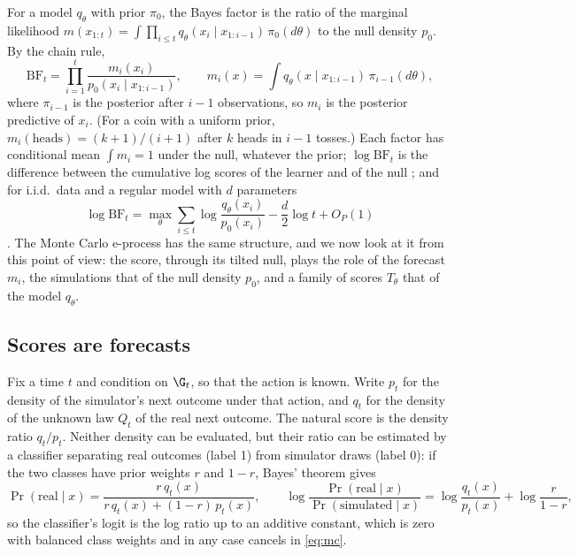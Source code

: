 For a model $q_\theta$ with prior $\pi_0$, the Bayes factor is the ratio of
the marginal likelihood $m(x_{1:t}) = \int \prod_{i \le t} q_\theta(x_i \mid x_{1:i-1})\,
\pi_0(d\theta)$ to the null density $p_0$. By the chain rule,
\begin{equation}\label{eq:prequential}
\mathrm{BF}_t = \prod_{i=1}^{t} \frac{m_i(x_i)}{p_0(x_i \mid x_{1:i-1})},
\qquad
m_i(x) = \int q_\theta(x \mid x_{1:i-1})\,\pi_{i-1}(d\theta),
\end{equation}
where $\pi_{i-1}$ is the posterior after $i-1$ observations, so $m_i$ is the
posterior predictive of $x_i$. (For a coin with a uniform prior,
$m_i(\text{heads}) = (k+1)/(i+1)$ after $k$ heads in $i-1$ tosses.) Each
factor has conditional mean $\int m_i = 1$ under the null, whatever the prior;
$\log \mathrm{BF}_t$ is the difference between the cumulative log scores of
the learner and of the null \citep{dawid1984present}; and for i.i.d.\ data
and a regular model with $d$ parameters
\[
\log \mathrm{BF}_t = \max_\theta \sum_{i \le t} \log\frac{q_\theta(x_i)}{p_0(x_i)}
- \frac d2 \log t + O_P(1)
\]
\citep{clarke1990information}. The Monte Carlo e-process has the same
structure, and we now look at it from this point of view: the score, through
its tilted null, plays the role of the forecast $m_i$, the simulations that of
the null density $p_0$, and a family of scores $T_\theta$ that of the model
$q_\theta$.

\subsection{Scores are forecasts}\label{sec:scores}

Fix a time $t$ and condition on $\G_t$, so that the action is known. Write
$p_t$ for the density of the simulator's next outcome under that action, and
$q_t$ for the density of the unknown law $Q_t$ of the real next outcome. The
natural score is the density ratio $q_t/p_t$. Neither density can be
evaluated, but their ratio can be estimated by a classifier separating real
outcomes (label 1) from simulator draws (label 0): if the two classes have
prior weights $r$ and $1-r$, Bayes' theorem gives
\[
\Pr(\text{real} \mid x) = \frac{r\, q_t(x)}{r\, q_t(x) + (1-r)\, p_t(x)},
\qquad
\log\frac{\Pr(\text{real} \mid x)}{\Pr(\text{simulated} \mid x)}
= \log\frac{q_t(x)}{p_t(x)} + \log\frac{r}{1-r},
\]
so the classifier's logit is the log ratio up to an additive constant, which
is zero with balanced class weights \citep{thomas2022lfire} and in any case
cancels in \eqref{eq:mc}.

